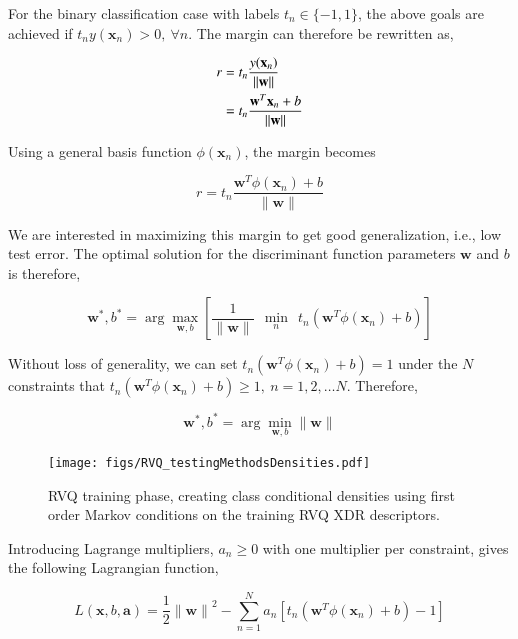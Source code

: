 For the binary classification case with labels $t_n \in \{-1, 1\}$, the above goals are achieved if $t_ny(\mathbf{x}_n)>0, \ \forall n$.  The margin can therefore be rewritten as,

\begin{align}
r &= t_n\frac{y(\mathbf{x}_n)}{{\|\mathbf{w}\|}}\\\notag
&=t_n\frac{\mathbf{w}^T\mathbf{x}_n+b}{\|\mathbf{w}\|}
\end{align}

Using a general basis function $\phi(\mathbf{x}_n)$, the margin becomes

\begin{equation}
r = t_n\frac{\mathbf{w}^T\phi(\mathbf{x}_n)+b}{\|\mathbf{w}\|}
\end{equation}

We are interested in maximizing this margin to get good generalization, i.e., low test error.  The optimal solution for the discriminant function parameters $\mathbf{w}$ and $b$ is therefore,

\begin{equation}
\mathbf{w}^*, b^* = \arg \max_{\mathbf{w},b} \left[\frac{1}{{\|\mathbf{w}\|}}\ \ \min_n \ \ t_n\left(\mathbf{w}^T\phi(\mathbf{x}_n)+b\right)\right]
\end{equation}

Without loss of generality, we can set $t_n\left(\mathbf{w}^T\phi(\mathbf{x}_n)+b\right) = 1$ under the $N$ constraints that $t_n\left(\mathbf{w}^T\phi(\mathbf{x}_n)+b\right) \geq 1, \ n=1, 2, \ldots N$.  Therefore,  

\begin{equation}
\mathbf{w}^*, b^* = \arg \min_{\mathbf{w},b} {\|\mathbf{w}\|}
\end{equation}

											\begin{figure}[t]
											\centering
											\texttt{[image: figs/RVQ\_testingMethodsDensities.pdf]}
											\caption{RVQ training phase, creating class conditional densities using first order Markov conditions on the training RVQ XDR descriptors.}
											\label{fig:RVQ_testingMethodsDensities}
											\end{figure}



Introducing Lagrange multipliers, $a_n \geq 0$ with one multiplier per constraint, gives the following Lagrangian function,

\begin{equation}
L(\mathbf{x}, b, \mathbf{a}) = \frac{1}{2}{\|\mathbf{w}\|}^2 - \sum\limits_{n=1}^N a_n \left[t_n\left(\mathbf{w}^T\phi(\mathbf{x}_n)+b\right)-1\right]
\label{Eqn:SVM_lagrange_function}
\end{equation}

